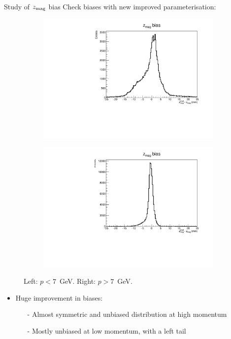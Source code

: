 \documentclass[xcolor={dvipsnames}]{beamer}
\begin{document}
\begin{frame}{Study of $z_{\rm mag}$ bias}
  \vspace{0.0cm}
  {\Large Check biases with new improved parameterisation:}
  \begin{figure}[htb]
    \centering
    \begin{subfigure}{0.50\textwidth}
      \includegraphics[width=1\textwidth]{Plots/z_mag_position_bias_new_parameterisation_low_p.pdf}
    \end{subfigure}%
    \begin{subfigure}{0.50\textwidth}
      \includegraphics[width=1\textwidth]{Plots/z_mag_position_bias_new_parameterisation_high_p.pdf}
    \end{subfigure}
    \vspace{-0.2cm}
    \caption*{Left: $p < 7$~GeV. Right: $p > 7$~GeV.}
  \end{figure}
  \vspace{-0.5cm}
  \begin{itemize}
    \item{Huge improvement in biases:}
    \begin{itemize}
      \item[-]{Almost symmetric and unbiased distribution at high momentum}
      \item[-]{Mostly unbiased at low momentum, with a left tail}
    \end{itemize}
  \end{itemize}
\end{frame}
\end{document}
